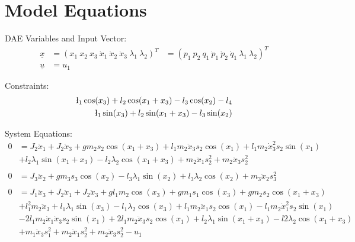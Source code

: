 \documentclass[10pt,a4paper]{article}
\begin{document}
	
	\section{Model Equations} %
	
	DAE Variables and Input Vector:
	\begin{align*}
		\underline{x} &= (x_1 \ x_2 \ x_3 \ \dot{x}_1 \ \dot{x}_2 \ \dot{x}_3 \ \lambda_1 \ \lambda_2)^T &= (p_1 \ p_2 \ q_1 \ \dot{p}_1 \ \dot{p}_2 \ \dot{q}_1 \ \lambda_1 \ \lambda_2)^T \\
		\underline{u} &= u_1
	\end{align*}
	
	\noindent Constraints:			
	\begin{subequations}
	\begin{align}
		\l_1\cos(x_3) + l_2\cos(x_1 + x_3) - l_3\cos(x_2) - l_4 \\
		\l_1\sin(x_3) + l_2\sin(x_1 + x_3) - l_3\sin(x_2)
	\end{align}
	\end{subequations}
	
	\noindent System Equations:			
	\begin{subequations}
	\begin{align*}
	0 &= J_2\ddot{x}_1 + J_2\ddot{x}_3 + g m_2 s_2\cos(x_1 + x_3) + l_1 m_2 \ddot{x}_3 s_2 \cos(x_1) + l_1 m_2 \dot{x}_3^2 s_2 \sin(x_1) \\
	&+ l_2 \lambda_1 \sin(x_1 + x_3) - l_2 \lambda_2 \cos(x_1 + x_3) + m_2 \ddot{x}_1 s_2^2 + m_2 \ddot{x}_3 s_2^2 \\ 
	\\
	0 &= J_3 \ddot{x}_2 + g m_3 s_3 \cos(x_2) - l_3 \lambda_1 \sin(x_2) + l_3 \lambda_2 \cos(x_2) + m_3 \ddot{x}_2 s_3^2 \\
	\\
	0 &= J_1 \ddot{x}_3 + J_2 \ddot{x}_1 + J_2 \ddot{x}_3 + g l_1 m_2 \cos(x_3) + g m_1 s_1 \cos(x_3) + g m_2 s_2 \cos(x_1 + x_3) \\
	&+ l_1^2 m_2 \ddot{x}_3 + l_1 \lambda_1 \sin(x_3) - l_1 \lambda_2 \cos(x_3) + l_1 m_2 \ddot{x}_1 s_2 \cos(x_1)- l_1 m_2 \dot{x}_1^2 s_2 \sin(x_1) \\
	&- 2 l_1 m_2 \dot{x}_1 \dot{x}_3 s_2 \sin(x_1) + 2 l_1 m_2 \ddot{x}_3 s_2 \cos(x_1)+ l_2 \lambda_1 \sin(x_1 + x_3) - l2 \lambda_2 \cos(x_1 + x_3) \\
	&+ m_1 \ddot{x}_3 s_1^2 + m_2 \ddot{x}_1 s_2^2 + m_2 \ddot{x}_3 s_2^2 - u_1 \\
	\end{align*}       
	\end{subequations}
\end{document}
